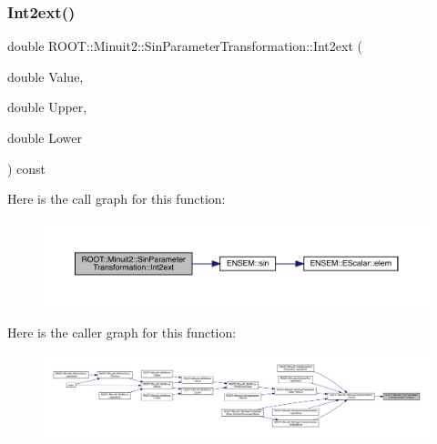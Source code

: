 \mbox{\label{classROOT_1_1Minuit2_1_1SinParameterTransformation_a53590482bc5734d9f079c8c5054d3de6}} 
\subsubsection{\texorpdfstring{Int2ext()}{Int2ext()}\hspace{0.1cm}{\footnotesize\ttfamily [2/3]}}
{\footnotesize\ttfamily double R\+O\+O\+T\+::\+Minuit2\+::\+Sin\+Parameter\+Transformation\+::\+Int2ext (\begin{DoxyParamCaption}\item[{double}]{Value,  }\item[{double}]{Upper,  }\item[{double}]{Lower }\end{DoxyParamCaption}) const}

Here is the call graph for this function\+:
\nopagebreak
\begin{figure}[H]
\begin{center}
\leavevmode
\includegraphics[width=350pt]{de/d62/classROOT_1_1Minuit2_1_1SinParameterTransformation_a53590482bc5734d9f079c8c5054d3de6_cgraph}
\end{center}
\end{figure}
Here is the caller graph for this function\+:
\nopagebreak
\begin{figure}[H]
\begin{center}
\leavevmode
\includegraphics[width=350pt]{de/d62/classROOT_1_1Minuit2_1_1SinParameterTransformation_a53590482bc5734d9f079c8c5054d3de6_icgraph}
\end{center}
\end{figure}
\mbox{\label{classROOT_1_1Minuit2_1_1SinParameterTransformation_a53590482bc5734d9f079c8c5054d3de6}} 
